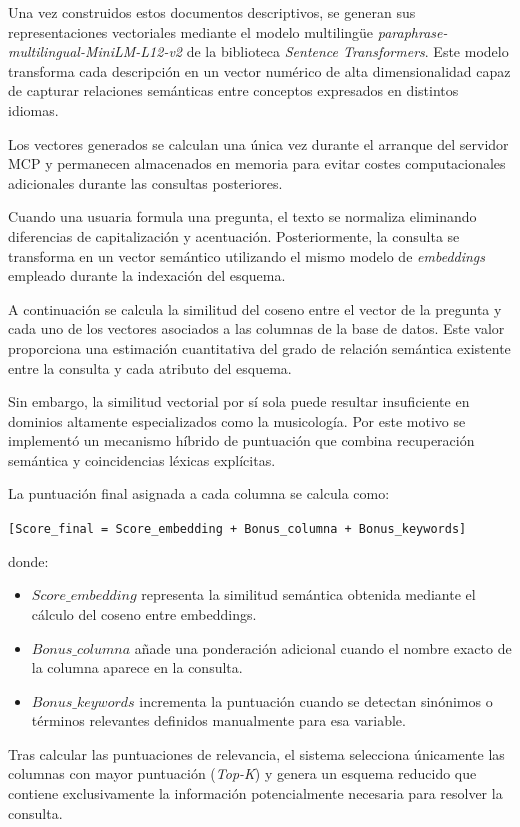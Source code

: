 Una vez construidos estos documentos descriptivos, se generan sus representaciones vectoriales mediante el modelo multilingüe \textit{paraphrase-multilingual-MiniLM-L12-v2} de la biblioteca \textit{Sentence Transformers}. Este modelo transforma cada descripción en un vector numérico de alta dimensionalidad capaz de capturar relaciones semánticas entre conceptos expresados en distintos idiomas.

Los vectores generados se calculan una única vez durante el arranque del servidor MCP y permanecen almacenados en memoria para evitar costes computacionales adicionales durante las consultas posteriores.

Cuando una usuaria formula una pregunta, el texto se normaliza eliminando diferencias de capitalización y acentuación. Posteriormente, la consulta se transforma en un vector semántico utilizando el mismo modelo de \textit{embeddings} empleado durante la indexación del esquema.

A continuación se calcula la similitud del coseno entre el vector de la pregunta y cada uno de los vectores asociados a las columnas de la base de datos. Este valor proporciona una estimación cuantitativa del grado de relación semántica existente entre la consulta y cada atributo del esquema.

Sin embargo, la similitud vectorial por sí sola puede resultar insuficiente en dominios altamente especializados como la musicología. Por este motivo se implementó un mecanismo híbrido de puntuación que combina recuperación semántica y coincidencias léxicas explícitas.

La puntuación final asignada a cada columna se calcula como:

\texttt{[Score\_{final} = Score\_{embedding} + Bonus\_{columna} + Bonus\_{keywords}]}

donde:

\begin{itemize}
\item $Score\_{embedding}$ representa la similitud semántica obtenida mediante el cálculo del coseno entre embeddings.
\item $Bonus\_{columna}$ añade una ponderación adicional cuando el nombre exacto de la columna aparece en la consulta.
\item $Bonus\_{keywords}$ incrementa la puntuación cuando se detectan sinónimos o términos relevantes definidos manualmente para esa variable.
\end{itemize}

Tras calcular las puntuaciones de relevancia, el sistema selecciona únicamente las columnas con mayor puntuación (\textit{Top-K}) y genera un esquema reducido que contiene exclusivamente la información potencialmente necesaria para resolver la consulta.

